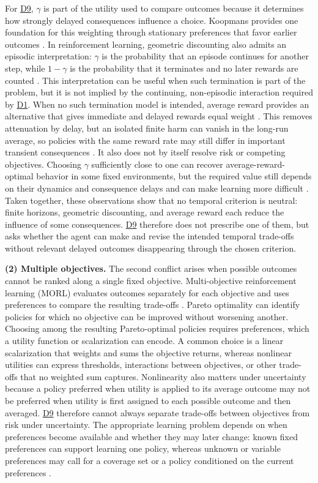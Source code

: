 \documentclass[10pt,journal,compsoc]{IEEEtran}
\DeclareRobustCommand{\Dref}[1]{\hyperref[sec:d#1]{D#1}}
\begin{document}
For \Dref{9}, $\gamma$ is part of the utility used to compare outcomes because it determines how strongly delayed consequences influence a choice.
Koopmans provides one foundation for this weighting through stationary preferences that favor earlier outcomes \cite{koopmans1960}.
In reinforcement learning, geometric discounting also admits an episodic interpretation: $\gamma$ is the probability that an episode continues for another step, while $1-\gamma$ is the probability that it terminates and no later rewards are counted \cite{sutton2018}.
This interpretation can be useful when such termination is part of the problem, but it is not implied by the continuing, non-episodic interaction required by \Dref{1}.
When no such termination model is intended, average reward provides an alternative that gives immediate and delayed rewards equal weight \cite{wan2021}.
This removes attenuation by delay, but an isolated finite harm can vanish in the long-run average, so policies with the same reward rate may still differ in important transient consequences \cite{mahadevan1996}.
It also does not by itself resolve risk or competing objectives.
Choosing $\gamma$ sufficiently close to one can recover average-reward-optimal behavior in some fixed environments, but the required value still depends on their dynamics and consequence delays and can make learning more difficult \cite{naik2019,dewanto2022}.
Taken together, these observations show that no temporal criterion is neutral: finite horizons, geometric discounting, and average reward each reduce the influence of some consequences.
\Dref{9} therefore does not prescribe one of them, but asks whether the agent can make and revise the intended temporal trade-offs without relevant delayed outcomes disappearing through the chosen criterion.

\noindent\textbf{(2) Multiple objectives.}
The second conflict arises when possible outcomes cannot be ranked along a single fixed objective.
Multi-objective reinforcement learning (MORL) evaluates outcomes separately for each objective and uses preferences to compare the resulting trade-offs \cite{roijers2013,hayes2022}.
Pareto optimality can identify policies for which no objective can be improved without worsening another.
Choosing among the resulting Pareto-optimal policies requires preferences, which a utility function or scalarization can encode.
A common choice is a linear scalarization that weights and sums the objective returns, whereas nonlinear utilities can express thresholds, interactions between objectives, or other trade-offs that no weighted sum captures.
Nonlinearity also matters under uncertainty because a policy preferred when utility is applied to its average outcome may not be preferred when utility is first assigned to each possible outcome and then averaged.
\Dref{9} therefore cannot always separate trade-offs between objectives from risk under uncertainty.
The appropriate learning problem depends on when preferences become available and whether they may later change: known fixed preferences can support learning one policy, whereas unknown or variable preferences may call for a coverage set or a policy conditioned on the current preferences \cite{hayes2022}.
\end{document}

